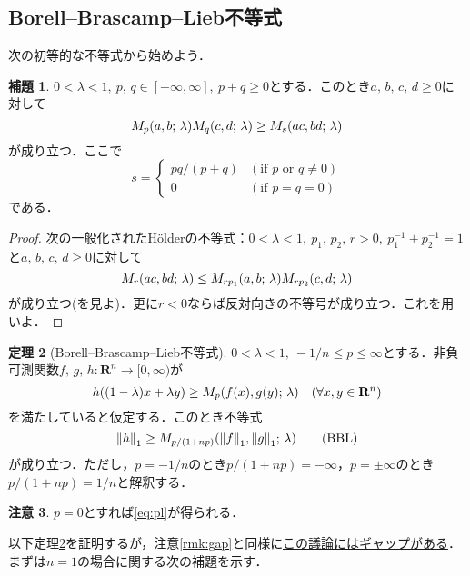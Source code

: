 \documentclass[a4j]{ltjsarticle}
\newcommand{\Rset}{\mathbf{R}}
\newcommand{\1}{\bm{1}}
\newcommand{\M}[4]{M_{#1}\qty(#2,#3;\,#4)}
\numberwithin{equation}{section}
\theoremstyle{definition}
\newtheorem{thm}{定理}[section]
\newtheorem{lem}[thm]{補題}
\newtheorem{rmk}[thm]{注意}
\begin{document}
\subsection{Borell--Brascamp--Lieb不等式}
次の初等的な不等式から始めよう．
\begin{lem}\label{lem:ave_ineq}
    $0<\lambda<1,\ p,\,q\in[-\infty,\infty],\ p+q\geq0$とする．このとき$a,\,b,\,c,\,d\geq0$に対して
    \begin{equation}
        \M{p}{a}{b}{\lambda}\M{q}{c}{d}{\lambda}\geq \M{s}{ac}{bd}{\lambda}
    \end{equation}
    が成り立つ．ここで
    \begin{equation}
        s=\begin{cases}
            pq/(p+q) & (\text{if $p$ or $q\neq0$})\\
            0 & (\text{if } p=q=0)
        \end{cases}
    \end{equation}
    である．
\end{lem}
\begin{proof}
    次の一般化されたH\"olderの不等式：$0<\lambda<1,\ p_1,\,p_2,\,r>0,\ p_1^{-1}+p_2^{-1}=1$と$a,\,b,\,c,\,d\geq0$に対して
    \begin{equation}
        \M{r}{ac}{bd}{\lambda}\leq \M{rp_1}{a}{b}{\lambda}\M{rp_2}{c}{d}{\lambda}
    \end{equation}
    が成り立つ(\cite{HLP}を見よ)．更に$r<0$ならば反対向きの不等号が成り立つ．これを用いよ．
\end{proof}
\begin{thm}[Borell--Brascamp--Lieb不等式]\label{thm:bbl}
    $0<\lambda<1,\ -1/n\leq p\leq \infty$とする．非負可測関数$f,\,g,\,h\colon \Rset^n\to[0,\infty)$が
    \begin{equation}
        h((1-\lambda)x+\lambda y)\geq \M{p}{f(x)}{g(y)}{\lambda}\quad (\forall x,y\in\Rset^n)
    \end{equation}
    を満たしていると仮定する．このとき不等式
    \begin{equation}
        \norm{h}_1\geq \M{p/(1+np)}{\norm{f}_1}{\norm{g}_1}{\lambda}\label{eq:bbl}\tag{BBL}
    \end{equation}    
    が成り立つ．ただし，$p=-1/n$のとき$p/(1+np)=-\infty$，$p=\pm\infty$のとき$p/(1+np)=1/n$と解釈する．
\end{thm}
\begin{rmk}
    $p=0$とすれば\eqref{eq:pl}が得られる．
\end{rmk}
以下定理\ref{thm:bbl}を証明するが，注意\ref{rmk:gap}と同様に\underline{この議論にはギャップがある}．まずは$n=1$の場合に関する次の補題を示す．
\end{document}
